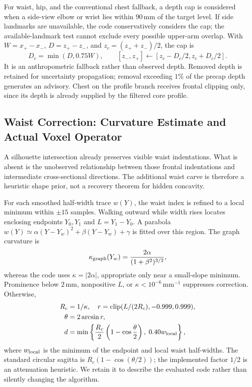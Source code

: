 For waist, hip, and the conventional chest fallback, a depth cap is considered when a side-view elbow or wrist lies within $90$\,mm of the target level. If side landmarks are unavailable, the code conservatively considers the cap; the available-landmark test cannot exclude every possible upper-arm overlap. With $W=x_+-x_-$, $D=z_+-z_-$, and $z_c=(z_++z_-)/2$, the cap is
\begin{equation}
D_c=\min(D,0.75W),\qquad [z_-,z_+]\leftarrow[z_c-D_c/2,z_c+D_c/2].
\end{equation}
It is an anthropometric fallback rather than observed depth. Removed depth is retained for uncertainty propagation; removal exceeding $1\%$ of the precap depth generates an advisory. Chest on the profile branch receives frontal clipping only, since its depth is already supplied by the filtered core profile.

\subsection{Waist Correction: Curvature Estimate and Actual Voxel Operator}
\label{subsec:waist_correction}
A silhouette intersection already preserves visible waist indentations. What is absent is the unobserved relationship between those frontal indentations and intermediate cross-sectional directions. The additional waist carve is therefore a heuristic shape prior, not a recovery theorem for hidden concavity.

For each smoothed half-width trace $w(Y)$, the waist index is refined to a local minimum within $\pm15$ samples. Walking outward while width rises locates enclosing endpoints $Y_0,Y_1$ and $L=Y_1-Y_0$. A parabola $w(Y)\simeq\alpha(Y-Y_w)^2+\beta(Y-Y_w)+\gamma$ is fitted over this region. The graph curvature is
\begin{equation}
\kappa_{\rm graph}(Y_w)=\frac{2\alpha}{(1+\beta^2)^{3/2}},
\label{eq:waist_curvature}
\end{equation}
whereas the code uses $\kappa=|2\alpha|$, appropriate only near a small-slope minimum. Prominence below $2$\,mm, nonpositive $L$, or $\kappa<10^{-6}$\,mm$^{-1}$ suppresses correction. Otherwise,
\begin{align}
R_c&=1/\kappa,\quad r=\operatorname{clip}(L/(2R_c),-0.999,0.999),\nonumber\\
\theta&=2\arcsin r,\label{eq:theta_arc}\\
d&=\min\left\{\frac{R_c}{2}\left(1-\cos\frac\theta2\right),\;0.40w_{\rm local}\right\},
\label{eq:sagitta}
\end{align}
where $w_{\rm local}$ is the minimum of the endpoint and local waist half-widths. The standard circular sagitta is $R_c(1-\cos(\theta/2))$; the implemented factor $1/2$ is an attenuation heuristic. We retain it to describe the evaluated code rather than silently changing the algorithm.

